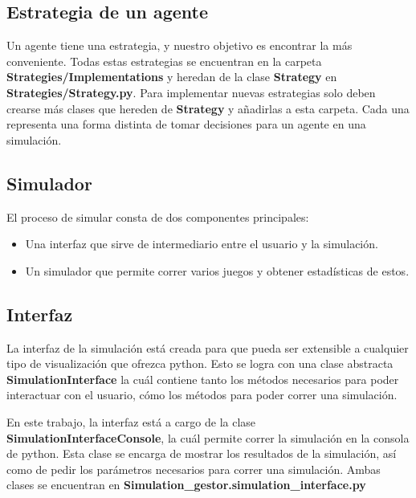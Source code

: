 \documentclass[11pt]{article}
\begin{document}
        \subsection{Estrategia de un agente}
        Un agente tiene una estrategia, y nuestro objetivo es encontrar la más conveniente. Todas estas 
        estrategias se encuentran en la carpeta \textbf{Strategies/Implementations} y heredan de la clase 
        \textbf{Strategy} en \textbf{Strategies/Strategy.py}. Para implementar nuevas estrategias solo deben
        crearse más clases que hereden de \textbf{Strategy} y añadirlas a esta carpeta. Cada una representa
        una forma distinta de tomar decisiones para un agente en una simulación.

        \subsection{Simulador}
        El proceso de simular consta de dos componentes principales:

        \begin{itemize}

            \item Una interfaz que sirve de intermediario entre el usuario y la simulación.
            
            \item Un simulador que permite correr varios juegos y obtener estadísticas de estos.
            
        \end{itemize}

        \subsection{Interfaz}
        La interfaz de la simulación está creada para que pueda ser extensible a cualquier tipo de 
        visualización que ofrezca python. Esto se logra con una clase abstracta \textbf{SimulationInterface} 
        la cuál contiene tanto los métodos necesarios para poder interactuar con el usuario, cómo los 
        métodos para poder correr una simulación. \vspace{5mm}

        \noindent En este trabajo, la interfaz está a cargo de la clase \textbf{SimulationInterfaceConsole}, la cuál permite 
        correr la simulación en la consola de python. Esta clase se encarga de mostrar los resultados de la 
        simulación, así como de pedir los parámetros necesarios para correr una simulación. Ambas clases se encuentran
        en \textbf{Simulation\_gestor.simulation\_interface.py}
\end{document}
